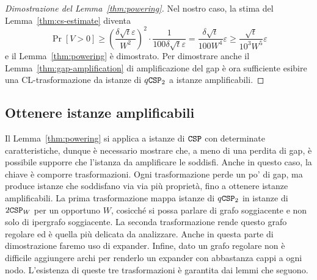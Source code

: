 \begin{proof}[Dimostrazione del Lemma~\ref{thm:powering}]
	Nel nostro caso, la stima del Lemma~\ref{thm:cs-estimate} diventa
	\[
		\Pr[V > 0] \ge \left( \frac{\delta \sqrt{t} \varepsilon}{W^2} \right)^2 \cdot
		\frac1{100 \delta \sqrt{t} \varepsilon}
		= \frac{\delta \sqrt{t}}{100 W^4} \varepsilon
		\ge \frac{\sqrt{t}}{10^3 W^5} \varepsilon
	\]
	e il Lemma~\ref{thm:powering} è dimostrato.
	Per dimostrare anche il Lemma~\ref{thm:gap-amplification} di amplificazione
	del gap è ora sufficiente esibire una CL-trasformazione da istanze di
	$q\mathtt{CSP}_2$ a istanze amplificabili.
\end{proof}

\subsection{Ottenere istanze amplificabili} \label{subsec:istanze-amplificabili}

Il Lemma~\ref{thm:powering} si applica a istanze di $\mathtt{CSP}$ con determinate
caratteristiche, dunque è necessario mostrare che, a meno di una perdita di gap,
è possibile supporre che l'istanza da amplificare le soddisfi.
Anche in questo caso, la chiave è comporre trasformazioni.
Ogni trasformazione perde un po' di gap, ma produce istanze che soddisfano via
via più proprietà, fino a ottenere istanze amplificabili.
La prima trasformazione mappa istanze di $q\mathtt{CSP}_2$ in istanze di $2\mathtt{CSP}_W$ per
un opportuno $W$, cosicché si possa parlare di grafo soggiacente e non solo di
ipergrafo soggiacente.
La seconda trasformazione rende questo grafo regolare ed è quella più
delicata da analizzare. Anche in questa parte di dimostrazione faremo uso di
expander.
Infine, dato un grafo regolare non è difficile aggiungere archi per renderlo
un expander con abbastanza cappi a ogni nodo.
L'esistenza di queste tre trasformazioni è garantita dai lemmi che seguono.


